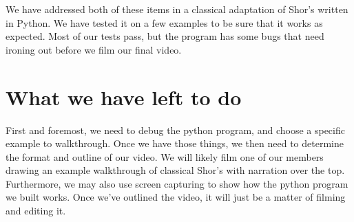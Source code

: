\documentclass[a4paper]{article}
\begin{document}
We have addressed both of these items in a classical adaptation of Shor's 
written in Python. We have tested it on a few examples to be sure that it works 
as expected. Most of our tests pass, but the program has some bugs that need ironing out 
before we film our final video.


\section{What we have left to do}
First and foremost, we need to debug the python program, and choose a specific example to walkthrough.
Once we have those things, we then need to determine the format and outline of our video. We will likely film one of 
our members drawing an example walkthrough of classical Shor's with narration over the top. Furthermore, we may also 
use screen capturing to show how the python program we built works. Once we've outlined the video, it will just be a 
matter of filming and editing it.

\newpage


\end{document}

